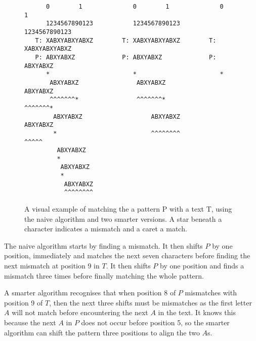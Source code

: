\begin{figure}
\begin{verbatim}
      0        1              0        1              0        1   
      1234567890123           1234567890123           1234567890123
   T: XABXYABXYABXZ        T: XABXYABXYABXZ        T: XABXYABXYABXZ
   P: ABXYABXZ             P: ABXYABXZ             P: ABXYABXZ     
      *                       *                       *            
       ABXYABXZ                ABXYABXZ                ABXYABXZ    
       ^^^^^^^*                ^^^^^^^*                ^^^^^^^*    
        ABXYABXZ                   ABXYABXZ                ABXYABXZ
        *                          ^^^^^^^^                   ^^^^^
         ABXYABXZ                                                  
         *                                                         
          ABXYABXZ                                                 
          *                                                        
           ABXYABXZ                                                
           ^^^^^^^^                                                
\end{verbatim}
    \caption{A visual example of matching the a pattern P with a text T, using the naive algorithm and two smarter versions. A star beneath a character indicates a mismatch and a caret a match. }
    \label{fig:stringmatchingexample}
\end{figure}

The naive algorithm starts by finding a mismatch. It then shifts $P$ by one position, immediately and matches the next seven characters before finding the next mismatch at position 9 in $T$. It then shifts $P$ by one position and finds a mismatch three times before finally matching the whole pattern. 

A smarter algorithm recognises that when position 8 of $P$ mismatches with position 9 of $T$, then the next three shifts must be mismatches as the first letter $A$ will not match before encountering the next $A$ in the text. It knows this because the next $A$ in $P$ does not occur before position 5, so the smarter algorithm can shift the pattern three positions to align the two $A$s. 


\begin{comment} %
\begin{algorithm}
\caption{An algorithm with caption}\label{alg:cap}
\begin{algorithmic}
\Require $n \geq 0$
\Ensure $y = x^n$
\State $y \gets 1$
\State $X \gets x$
\State $N \gets n$
\While{$N \neq 0$}
\If{$N$ is even}
    \State $X \gets X \times X$
    \State $N \gets \frac{N}{2}$  \Comment{This is a comment}
\ElsIf{$N$ is odd}
    \State $y \gets y \times X$
    \State $N \gets N - 1$
\EndIf
\EndWhile
\end{algorithmic}
\end{algorithm}
\end{comment}


